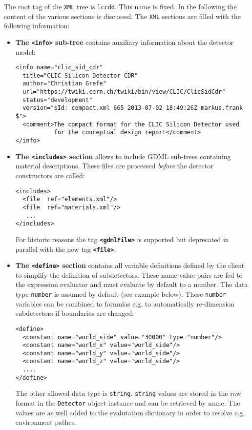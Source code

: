The root tag of the \texttt{XML} tree is {\texttt{lccdd}}. This name is fixed. In the following the content of the various sections is discussed. The \texttt{XML} sections are filled with the following information:
\begin{itemize}
\item {\textbf{The \texttt{<info>} sub-tree}} contains auxiliary information about the detector model:
\begin{verbatim}
<info name="clic_sid_cdr"
  title="CLIC Silicon Detector CDR"
  author="Christian Grefe"
  url="https://twiki.cern.ch/twiki/bin/view/CLIC/ClicSidCdr"
  status="development"
  version="$Id: compact.xml 665 2013-07-02 18:49:26Z markus.frank $">
  <comment>The compact format for the CLIC Silicon Detector used 
           for the conceptual design report</comment>
</info>
\end{verbatim}

\item {\textbf{The \texttt{<includes>} section}} allows to include GDML sub-trees containing material descriptions. These files are processed {\textit{before}} the detector constructors are called:
\begin{verbatim}
<includes>
  <file  ref="elements.xml"/>
  <file  ref="materials.xml"/>
   ...
</includes>
\end{verbatim}
For historic reasons the tag {\textbf{\texttt{<gdmlFile>}}} is supported but deprecated in parallel
with the new tag {\textbf{\texttt{<file>}}}.


\item {\textbf{The \texttt{<define>} section}} contains all variable definitions defined by the client to simplify the definition of subdetectors. These name-value pairs are fed to the expression evaluator and must evaluate by default to a number. The data type
  {\texttt{number}} is assumed by default (see example below).
These {\texttt{number}} variables can be combined to formulas e.g. to automatically re-dimension subdetectors if boundaries are changed:
\begin{verbatim}
<define>
  <constant name="world_side" value="30000" type="number"/>
  <constant name="world_x" value="world_side"/>
  <constant name="world_y" value="world_side"/>
  <constant name="world_z" value="world_side"/>
  ....
</define>
\end{verbatim}
The other allowed data type is {\texttt{string}}. {\texttt{string}} values are stored in the raw format in the {\texttt{Detector}} object instance and can be retrieved by name. The values are as well added to the evalutation dictionary in order to resolve e.g. environment pathes.


\end{itemize}
